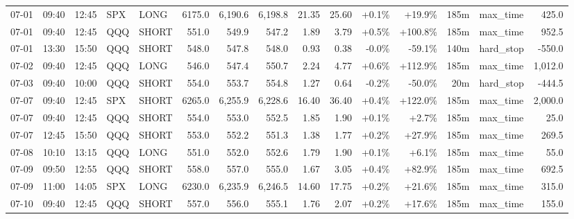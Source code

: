 \documentclass[11pt,a4paper,twoside]{article}
\begin{document}
\begin{landscape}
\begin{center}
\begin{longtable}{>{\color{txtmain}}l l l l l r r r r r r r r >{\color{txtmain}}l r}
07-01 & 09:40 & 12:45 & SPX & LONG & 6175.0 & 6,190.6 & 6,198.8 & 21.35 & 25.60 & \textcolor{wingreen}{+0.1\%} & \textcolor{wingreen}{+19.9\%} & 185m & max\_time & \textcolor{wingreen}{425.0} \\
07-01 & 09:40 & 12:45 & QQQ & SHORT & 551.0 & 549.9 & 547.2 & 1.89 & 3.79 & \textcolor{wingreen}{+0.5\%} & \textcolor{wingreen}{+100.8\%} & 185m & max\_time & \textcolor{wingreen}{952.5} \\
07-01 & 13:30 & 15:50 & QQQ & SHORT & 548.0 & 547.8 & 548.0 & 0.93 & 0.38 & \textcolor{lossred}{-0.0\%} & \textcolor{lossred}{-59.1\%} & 140m & hard\_stop & \textcolor{lossred}{-550.0} \\
07-02 & 09:40 & 12:45 & QQQ & LONG & 546.0 & 547.4 & 550.7 & 2.24 & 4.77 & \textcolor{wingreen}{+0.6\%} & \textcolor{wingreen}{+112.9\%} & 185m & max\_time & \textcolor{wingreen}{1,012.0} \\
07-03 & 09:40 & 10:00 & QQQ & SHORT & 554.0 & 553.7 & 554.8 & 1.27 & 0.64 & \textcolor{lossred}{-0.2\%} & \textcolor{lossred}{-50.0\%} & 20m & hard\_stop & \textcolor{lossred}{-444.5} \\
07-07 & 09:40 & 12:45 & SPX & SHORT & 6265.0 & 6,255.9 & 6,228.6 & 16.40 & 36.40 & \textcolor{wingreen}{+0.4\%} & \textcolor{wingreen}{+122.0\%} & 185m & max\_time & \textcolor{wingreen}{2,000.0} \\
07-07 & 09:40 & 12:45 & QQQ & SHORT & 554.0 & 553.0 & 552.5 & 1.85 & 1.90 & \textcolor{wingreen}{+0.1\%} & \textcolor{wingreen}{+2.7\%} & 185m & max\_time & \textcolor{wingreen}{25.0} \\
07-07 & 12:45 & 15:50 & QQQ & SHORT & 553.0 & 552.2 & 551.3 & 1.38 & 1.77 & \textcolor{wingreen}{+0.2\%} & \textcolor{wingreen}{+27.9\%} & 185m & max\_time & \textcolor{wingreen}{269.5} \\
07-08 & 10:10 & 13:15 & QQQ & LONG & 551.0 & 552.0 & 552.6 & 1.79 & 1.90 & \textcolor{wingreen}{+0.1\%} & \textcolor{wingreen}{+6.1\%} & 185m & max\_time & \textcolor{wingreen}{55.0} \\
07-09 & 09:50 & 12:55 & QQQ & SHORT & 558.0 & 557.0 & 555.0 & 1.67 & 3.05 & \textcolor{wingreen}{+0.4\%} & \textcolor{wingreen}{+82.9\%} & 185m & max\_time & \textcolor{wingreen}{692.5} \\
07-09 & 11:00 & 14:05 & SPX & LONG & 6230.0 & 6,235.9 & 6,246.5 & 14.60 & 17.75 & \textcolor{wingreen}{+0.2\%} & \textcolor{wingreen}{+21.6\%} & 185m & max\_time & \textcolor{wingreen}{315.0} \\
07-10 & 09:40 & 12:45 & QQQ & SHORT & 557.0 & 556.0 & 555.1 & 1.76 & 2.07 & \textcolor{wingreen}{+0.2\%} & \textcolor{wingreen}{+17.6\%} & 185m & max\_time & \textcolor{wingreen}{155.0} \\

\end{longtable}
\end{center}
\end{landscape}
\end{document}
